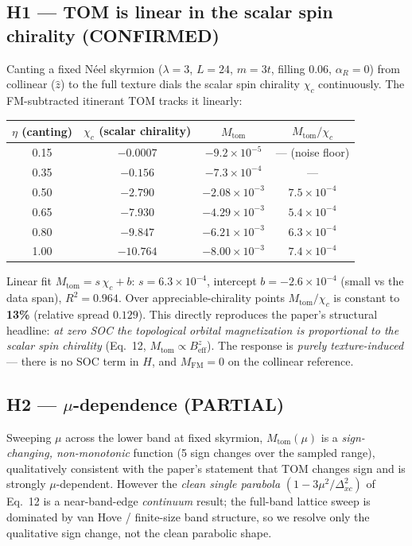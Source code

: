 \documentclass[11pt]{article}
\begin{document}
\subsection{H1 --- TOM is linear in the scalar spin chirality (CONFIRMED)}
Canting a fixed N\'eel skyrmion ($\lambda=3$, $L=24$, $m=3t$, filling $0.06$,
\emph{$\alpha_R=0$}) from collinear ($\hat z$) to the full texture dials the
scalar spin chirality $\chi_c$ continuously. The FM-subtracted itinerant TOM
tracks it linearly:

\begin{center}\begin{tabular}{cccc}
\toprule
$\eta$ (canting) & $\chi_c$ (scalar chirality) & $M_{\mathrm{tom}}$ & $M_{\mathrm{tom}}/\chi_c$\\
\midrule
0.15 & $-0.0007$ & $-9.2\times10^{-5}$ & --- (noise floor)\\
0.35 & $-0.156$  & $-7.3\times10^{-4}$ & ---\\
0.50 & $-2.790$  & $-2.08\times10^{-3}$ & $7.5\times10^{-4}$\\
0.65 & $-7.930$  & $-4.29\times10^{-3}$ & $5.4\times10^{-4}$\\
0.80 & $-9.847$  & $-6.21\times10^{-3}$ & $6.3\times10^{-4}$\\
1.00 & $-10.764$ & $-8.00\times10^{-3}$ & $7.4\times10^{-4}$\\
\bottomrule
\end{tabular}\end{center}

Linear fit $M_{\mathrm{tom}}=s\,\chi_c+b$: $s=6.3\times10^{-4}$,
intercept $b=-2.6\times10^{-4}$ (small vs the data span), \textbf{$R^2=0.964$}.
Over appreciable-chirality points $M_{\mathrm{tom}}/\chi_c$ is constant to
\textbf{13\%} (relative spread $0.129$). This directly reproduces the paper's
structural headline: \emph{at zero SOC the topological orbital magnetization is
proportional to the scalar spin chirality} (Eq.~12, $M_{\mathrm{tom}}\propto
B_{\mathrm{eff}}^z$). The response is \emph{purely texture-induced} --- there is
no SOC term in $H$, and $M_{\mathrm{FM}}=0$ on the collinear reference.

\subsection{H2 --- $\mu$-dependence (PARTIAL)}
Sweeping $\mu$ across the lower band at fixed skyrmion, $M_{\mathrm{tom}}(\mu)$ is
a \emph{sign-changing, non-monotonic} function (5 sign changes over the sampled
range), qualitatively consistent with the paper's statement that TOM changes sign
and is strongly $\mu$-dependent. However the \emph{clean single parabola}
$(1-3\mu^2/\Delta_{xc}^2)$ of Eq.~12 is a near-band-edge \emph{continuum} result;
the full-band lattice sweep is dominated by van Hove / finite-size band structure,
so we resolve only the qualitative sign change, not the clean parabolic shape.
\end{document}
